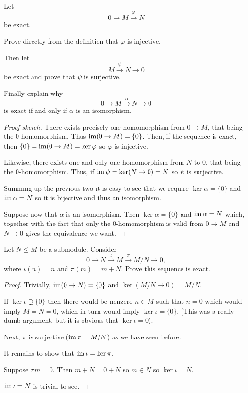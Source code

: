 \documentclass[11pt]{article}
\begin{document}
\begin{prob}
    Let 
    \[
        0 \to M \overset{\varphi}\to N 
    \]
    be exact. 

    Prove directly from the definition that 
    $\varphi$ is injective. 

    Then let 
    \[
        M \overset{\psi}\to N \to 0 
    \]
    be exact and prove that $\psi$ is surjective.
    
    Finally explain why 
    \[
        0 \to M \overset{\alpha}\to N \to 0 
    \]
    is exact if and only if $\alpha$ is an isomorphism. 
\end{prob}
\begin{proof}[Proof sketch]
    There exists precisely 
    one homomorphism from $0 \to M$, that 
    being the $0$-homomorphism. 
    Thus $\operatorname{im}(0 \to M) = \{0\}$. 
    Then, if the sequence is exact, then 
    $\{0\} = \operatorname{im}(0 \to M) = \ker \varphi$ 
    so $\varphi$ is injective. 

    Likewise, there exists one and only one 
    homomorphism from $N$ to $0$, that being 
    the $0$-homomorphism. 
    Thus, if $\operatorname{im} \psi = \ker (N \to 0) = N$ so 
    $\psi$ is surjective. 
    
    Summing up the previous two it is easy to see 
    that we require 
    $\ker \alpha = \{0\}$ and $\operatorname{im} \alpha = N$ 
    so it is bijective and thus an isomorphism. 

    Suppose now that $\alpha$ is an isomorphism. 
    Then $\ker \alpha = \{0\}$ and 
    $\operatorname{im} \alpha = N$ which, together with the fact 
    that only the $0$-homomorphism is valid from 
    $0 \to M$ and $N \to 0$ gives the 
    equivalence we want. 
\end{proof}

\begin{prob}
    Let $N \leq M$ be a submodule. 
    Consider 
    \[
        0 \to N \overset{\iota}\to M 
        \overset\pi\to M/N \to 0, 
    \]
    where $\iota(n) = n$ and $\pi(m) = m+N$. 
    Prove this sequence is exact. 
\end{prob}
\begin{proof}
    Trivially, 
    $\operatorname{im} (0 \to N) = \{0\}$ and 
    $\ker (M/N \to 0) = M/N$. 

    If $\ker \iota \supsetneq \{0\}$ then 
    there would be nonzero $n \in M$ 
    such that $n = 0$ which would imply $M = N = 0$, 
    which in turn would imply $\ker \iota = \{0\}$. 
    (This was a really dumb argument, but it is obvious 
    that $\ker \iota = 0$). 

    Next, $\pi$ is surjective ($\operatorname{im} \pi = M/N$) 
    as we have seen before.   

    It remains to show that 
    $\operatorname{im} \iota = \ker \pi$. 

    Suppose $\pi m = 0$. Then $\overline m + N 
    = 0 + N$ so 
    $m \in N$ so $\ker \iota = N$. 
    
    $\operatorname{im} \iota = N$ is trivial to see. 
\end{proof}
\end{document}
